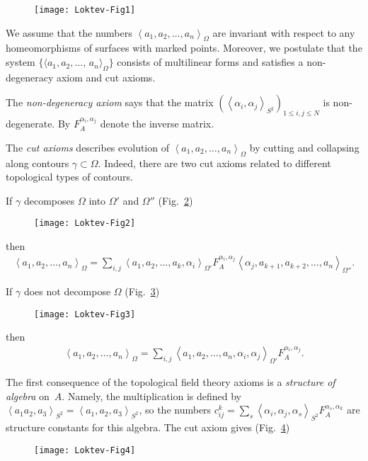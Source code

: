 \documentclass[pdftex]{sigma}
\def \lc {\left<}
\def \rc {\right>}
\begin{document}
\begin{figure}[tbph]
\centering
\texttt{[image: Loktev-Fig1]}
\caption{}\label{f1}
\end{figure}


We assume that the numbers $\lc a_1,a_2,\dots ,a_n \rc_{\Omega}$
are invariant with respect to
any homeo\-morphisms of surfaces with marked points. Moreover, we postulate
that the system $\{ \langle a_1,a_2,\dots$, $a_n\rangle_{\Omega}\}$ consists of
multilinear forms and satisf\/ies a non-degeneracy axiom and cut axioms.

The \textit{\textit{non-degeneracy axiom}} says that the matrix
$\left(\lc \alpha_i,\alpha_j \rc_{S^2}\right)_{1\le i,j \le N}$
is non-degenerate.
By $F^{\alpha_i,\alpha_j}_A$ denote
the inverse matrix.

The \textit{cut axioms}  describes evolution of
$\lc a_1,a_2,\dots ,a_n \rc_{\Omega}$ by cutting and collapsing along  contours
$\gamma\subset\Omega$. Indeed, there are two cut axioms related to dif\/ferent
topological types of contours.



If $\gamma$ decomposes $\Omega$ into  $\Omega'$ and
$\Omega''$ (Fig.~\ref{f2})


\begin{figure}[tbph]
\centering
\texttt{[image: Loktev-Fig2]}
\caption{}\label{f2}
\end{figure}

\noindent
then
\begin{gather*}
\lc a_1,a_2,\dots ,a_n \rc_{\Omega} = \sum_{i,j}
\lc a_1,a_2,\dots ,a_k,\alpha_i \rc_{\Omega'}F^{\alpha_i,\alpha_j}_A
\lc \alpha_j,a_{k+1}, a_{k+2},\dots ,a_n \rc_{\Omega''}.
\end{gather*}




If $\gamma$ does not decompose $\Omega$ (Fig.~\ref{f3})


\begin{figure}[tbph]
\centering
\texttt{[image: Loktev-Fig3]}
\caption{}\label{f3}
\end{figure}

\noindent
then
\begin{gather*}
\lc a_1,a_2,\dots ,a_n \rc_{\Omega} = \sum_{i,j}
\lc a_1,a_2,\dots ,a_n,\alpha_i,\alpha_j \rc_{\Omega'}F^{\alpha_i,\alpha_j}_A.
\end{gather*}


The f\/irst consequence of the topological f\/ield theory axioms is a
\textit{structure of algebra} on~$A$. Namely, the multiplication is def\/ined by
$\lc a_1 a_2,  a_3 \rc_{S^2}= \lc a_1, a_2, a_3 \rc_{S^2}$, so the numbers
$c_{ij}^{k}=\sum_{s} \lc \alpha_i, \alpha_j, \alpha_s \rc_{S^2} F^{\alpha_s,\alpha_k}_A$
are structure constants for this algebra. The cut axiom gives (Fig.~\ref{f4})
\begin{figure}[tbph]
\centering
\texttt{[image: Loktev-Fig4]}
\caption{}\label{f4}\vspace{-6mm}
\end{figure}
\end{document}
